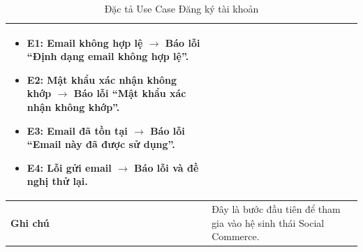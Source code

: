 \begin{table}[H]
\begin{tabularx}{\textwidth}{|l|X|}
\begin{itemize}
    \item E1: Email không hợp lệ $\rightarrow$ Báo lỗi ``Định dạng email không hợp lệ''.
    \item E2: Mật khẩu xác nhận không khớp $\rightarrow$ Báo lỗi ``Mật khẩu xác nhận không khớp''.
    \item E3: Email đã tồn tại $\rightarrow$ Báo lỗi ``Email này đã được sử dụng''.
    \item E4: Lỗi gửi email $\rightarrow$ Báo lỗi và đề nghị thử lại.
\end{itemize} \\ \hline
\textbf{Ghi chú} & Đây là bước đầu tiên để tham gia vào hệ sinh thái Social Commerce. \\ \hline
\end{tabularx}
\caption{Đặc tả Use Case Đăng ký tài khoản}
\end{table}

